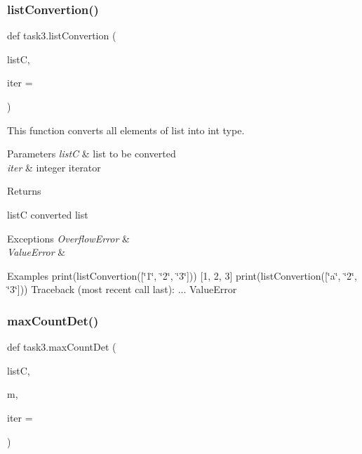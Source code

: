 \subsubsection{\texorpdfstring{list\+Convertion()}{listConvertion()}}
{\footnotesize\ttfamily def task3.\+list\+Convertion (\begin{DoxyParamCaption}\item[{}]{listC,  }\item[{}]{iter = {} }\end{DoxyParamCaption})}



This function converts all elements of list into int type. 


\begin{DoxyParams}{Parameters}
{\em listC} & list to be converted \\
\hline
{\em iter} & integer iterator \\
\hline
\end{DoxyParams}
\begin{DoxyReturn}{Returns}


listC converted list
\end{DoxyReturn}

\begin{DoxyExceptions}{Exceptions}
{\em Overflow\+Error} & \\
\hline
{\em Value\+Error} & \\
\hline
\end{DoxyExceptions}
\begin{DoxyParagraph}{Examples}
print(list\+Convertion(\mbox{[}\char`\"{}1\char`\"{}, \char`\"{}2\char`\"{}, \char`\"{}3\char`\"{}\mbox{]})) \mbox{[}1, 2, 3\mbox{]} print(list\+Convertion(\mbox{[}\char`\"{}a\char`\"{}, \char`\"{}2\char`\"{}, \char`\"{}3\char`\"{}\mbox{]})) Traceback (most recent call last)\+: ... Value\+Error 
\end{DoxyParagraph}
\mbox{\label{namespacetask3_a59c205e4cf87f8cc7c2c1e6bb5d6d318}} 
\subsubsection{\texorpdfstring{max\+Count\+Det()}{maxCountDet()}}
{\footnotesize\ttfamily def task3.\+max\+Count\+Det (\begin{DoxyParamCaption}\item[{}]{listC,  }\item[{}]{m,  }\item[{}]{iter = {} }\end{DoxyParamCaption})}



